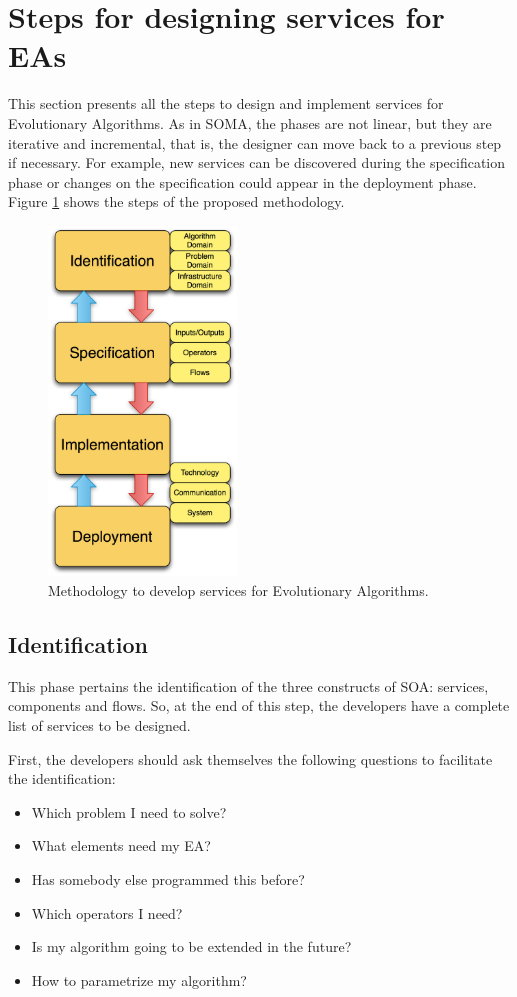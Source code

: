 


\section{Steps for designing services for EAs}
This section presents all the steps to design and implement services for Evolutionary Algorithms.
 As in SOMA, the phases are not linear, but they are iterative and incremental, that is, the designer can move back to a previous step if necessary. For example,
 new services can be discovered during the specification phase or changes on the specification could appear in the deployment phase. Figure \ref{fig:distributed:methodology} shows the steps of the proposed methodology.

\begin{figure}
\centering
\includegraphics[width=5cm]{gfx/soaea/methodology.jpg}
\caption{Methodology to develop services for Evolutionary Algorithms.}
\label{fig:distributed:methodology}
\end{figure}

\subsection{Identification}
\label{subsec:soaea:identification}
This phase pertains the identification of the three constructs of SOA: services, components and flows. So, at the end of this step, the developers have a complete list of services to be designed.

First, the developers should ask themselves the following questions to facilitate the identification:
\begin{itemize}
\item Which problem I need to solve?
\item What elements need my EA?
\item Has somebody else programmed this before?
\item Which operators I need?
\item Is my algorithm going to be extended in the future?
\item How to parametrize my algorithm?
\end{itemize}

